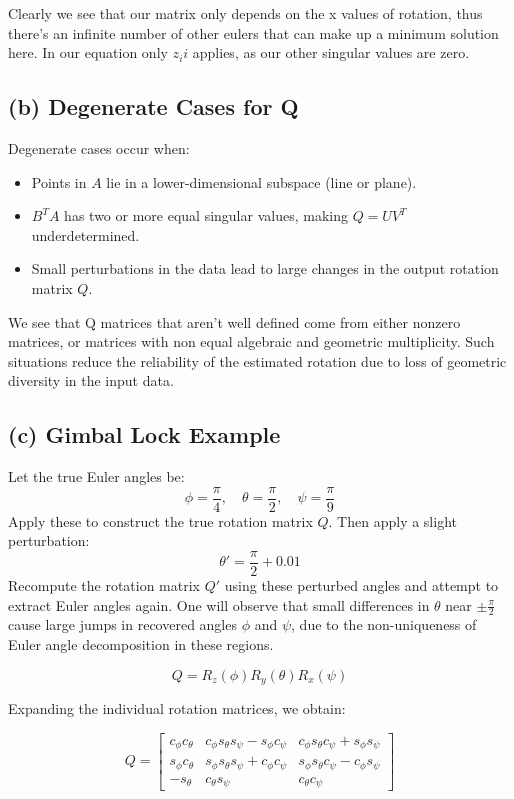 \documentclass[12pt]{article}
\begin{document}
Clearly we see that our matrix only depends on the x values of rotation, thus there's an infinite number of other eulers that can make up a minimum solution here. In our equation only $z_ii$ applies, as our other singular values are zero.


\subsection*{(b) Degenerate Cases for Q}
Degenerate cases occur when:
\begin{itemize}
  \item Points in \( A \) lie in a lower-dimensional subspace (line or plane).
  \item \( B^T A \) has two or more equal singular values, making \( Q = UV^T \) underdetermined.
  \item Small perturbations in the data lead to large changes in the output rotation matrix \( Q \).
\end{itemize}

We see that Q matrices that aren't well defined come from either nonzero matrices, or matrices with non equal algebraic and geometric multiplicity.\newline\newline
Such situations reduce the reliability of the estimated rotation due to loss of geometric diversity in the input data.

\subsection*{(c) Gimbal Lock Example}
Let the true Euler angles be:
\[
\phi = \frac{\pi}{4}, \quad \theta = \frac{\pi}{2}, \quad \psi = \frac{\pi}{9}
\]
Apply these to construct the true rotation matrix \( Q \). Then apply a slight perturbation:
\[
\theta' = \frac{\pi}{2} + 0.01
\]
Recompute the rotation matrix \( Q' \) using these perturbed angles and attempt to extract Euler angles again. One will observe that small differences in \( \theta \) near \( \pm \frac{\pi}{2} \) cause large jumps in recovered angles \( \phi \) and \( \psi \), due to the non-uniqueness of Euler angle decomposition in these regions.

\[
Q = R_z(\phi) R_y(\theta) R_x(\psi)
\]

Expanding the individual rotation matrices, we obtain:

\[
Q =
\begin{bmatrix}
c_\phi c_\theta  & c_\phi s_\theta s_\psi - s_\phi c_\psi  & c_\phi s_\theta c_\psi + s_\phi s_\psi  \\
s_\phi c_\theta  & s_\phi s_\theta s_\psi + c_\phi c_\psi  & s_\phi s_\theta c_\psi - c_\phi s_\psi  \\
- s_\theta  & c_\theta s_\psi  & c_\theta c_\psi
\end{bmatrix}
\]
\end{document}
